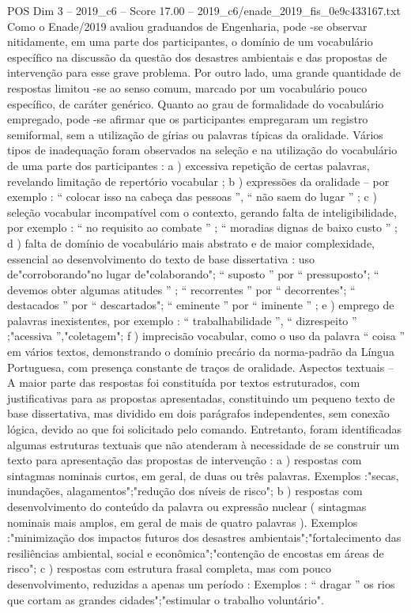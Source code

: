 \begin{textsample}{POS Dim 3 – 2019\_c6 – Score 17.00 – 2019\_c6/enade\_2019\_fis\_0e9c433167.txt}
Como o Enade/2019 avaliou graduandos de Engenharia, pode -se observar nitidamente, em uma parte dos participantes, o domínio de um vocabulário específico na discussão da questão dos desastres ambientais e das propostas de intervenção para esse grave problema.
Por outro lado, uma grande quantidade de respostas limitou -se ao senso comum, marcado por um vocabulário pouco específico, de caráter genérico.
Quanto ao grau de formalidade do vocabulário empregado, pode -se afirmar que os participantes empregaram um registro semiformal, sem a utilização de gírias ou palavras típicas da oralidade.
Vários tipos de inadequação foram observados na seleção e na utilização do vocabulário de uma parte dos participantes : a ) excessiva repetição de certas palavras, revelando limitação de repertório vocabular ; b ) expressões da oralidade – por exemplo : “ colocar isso na cabeça das pessoas ”, “ não saem do lugar ” ; c ) seleção vocabular incompatível com o contexto, gerando falta de inteligibilidade, por exemplo : “ no requisito ao combate ” ; “ moradias dignas de baixo custo ” ; d ) falta de domínio de vocabulário mais abstrato e de maior complexidade, essencial ao desenvolvimento do texto de base dissertativa : uso de"corroborando"no lugar de"colaborando"; “ suposto ” por “ pressuposto"; “ devemos obter algumas atitudes ” ; “ recorrentes ” por “ decorrentes"; “ destacados ” por “ descartados"; “ eminente ” por “ iminente ” ; e ) emprego de palavras inexistentes, por exemplo : “ trabalhabilidade ”, “ dizrespeito ” ;"acessiva ”,"coletagem"; f ) imprecisão vocabular, como o uso da palavra “ coisa ” em vários textos, demonstrando o domínio precário da norma-padrão da Língua Portuguesa, com presença constante de traços de oralidade.
Aspectos textuais – A maior parte das respostas foi constituída por textos estruturados, com justificativas para as propostas apresentadas, constituindo um pequeno texto de base dissertativa, mas dividido em dois parágrafos independentes, sem conexão lógica, devido ao que foi solicitado pelo comando.
Entretanto, foram identificadas algumas estruturas textuais que não atenderam à necessidade de se construir um texto para apresentação das propostas de intervenção : a ) respostas com sintagmas nominais curtos, em geral, de duas ou três palavras.
Exemplos :"secas, inundações, alagamentos";"redução dos níveis de risco"; b ) respostas com desenvolvimento do conteúdo da palavra ou expressão nuclear ( sintagmas nominais mais amplos, em geral de mais de quatro palavras ).
Exemplos :"minimização dos impactos futuros dos desastres ambientais";"fortalecimento das resiliências ambiental, social e econômica";"contenção de encostas em áreas de risco"; c ) respostas com estrutura frasal completa, mas com pouco desenvolvimento, reduzidas a apenas um período : Exemplos : “ dragar ” os rios que cortam as grandes cidades";"estimular o trabalho voluntário".

\end{textsample}
